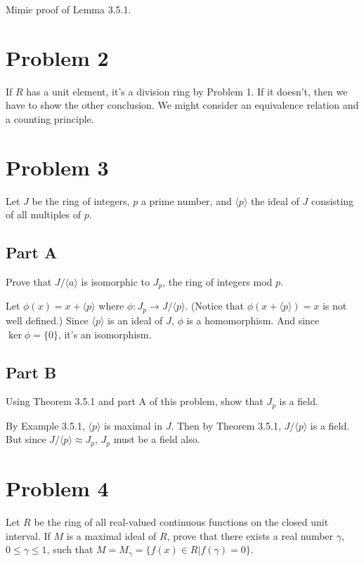 \documentclass[12pt]{article}
\begin{document}
Mimic proof of Lemma 3.5.1.

\section*{Problem 2}

If $R$ has a unit element, it's a division ring by Problem 1.  If it doesn't, then we have to show the other conclusion.
We might consider an equivalence relation and a counting principle.

\section*{Problem 3}

Let $J$ be the ring of integers, $p$ a prime number, and $\langle p\rangle$ the ideal of $J$
consisting of all multiples of $p$.

\subsection*{Part A}

Prove that $J/\langle a\rangle$ is isomorphic to $J_p$, the ring of integers mod $p$.

Let $\phi(x)=x+\langle p\rangle$ where $\phi:J_p\to J/\langle p\rangle$.  (Notice that $\phi(x+\langle p\rangle)=x$ is not well defined.)
Since $\langle p\rangle$ is an ideal of $J$, $\phi$ is a homomorphism.  And since $\ker\phi=\{0\}$,
it's an isomorphism.

\subsection*{Part B}

Using Theorem 3.5.1 and part A of this problem, show that $J_p$ is a field.

By Example 3.5.1, $\langle p\rangle$ is maximal in $J$.  Then by Theorem 3.5.1, $J/\langle p\rangle$ is a field.
But since $J/\langle p\rangle\approx J_p$, $J_p$ must be a field also.

\section*{Problem 4}

Let $R$ be the ring of all real-valued continuous functions on the closed unit interval.
If $M$ is a maximal ideal of $R$, prove that there exists a real number $\gamma$,
$0\leq\gamma\leq 1$, such that $M=M_{\gamma}=\{f(x)\in R|f(\gamma)=0\}$.
\end{document}
